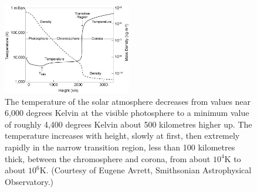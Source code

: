 \begin{figure}[H]
  \begin{center}
    \includegraphics[width=0.5\textwidth]{solar-atm-plot}
\caption{The temperature of the solar atmosphere decreases from values near 6,000 degrees Kelvin at the visible photosphere to a minimum value of roughly 4,400 degrees Kelvin about 500 kilometres higher up. The temperature increases with height, slowly at first, then extremely rapidly in the narrow transition region, less than 100 kilometres thick, between the chromosphere and corona, from about $10^{4}$K to about $10^{6}$K. (Courtesy of Eugene Avrett, Smithsonian Astrophysical Observatory.)}\label{solatm}
  \end{center}
\end{figure}


